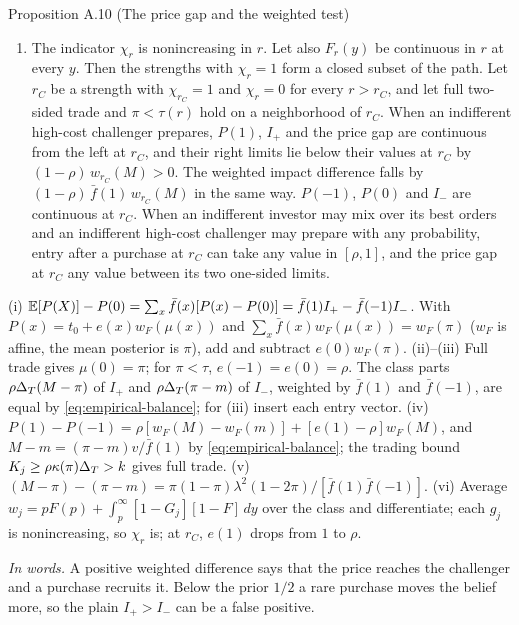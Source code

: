 {\begin{paperresult}{Proposition A.10 (The price gap and the weighted test)}
\begin{enumerate}[label=(\roman*),leftmargin=2em,nosep]
\begin{enumerate}[label=(\alph*),leftmargin=2em,nosep]
\item The indicator \(\chi_r\) is nonincreasing in \(r\). Let also \(F_r(y)\) be continuous in \(r\) at every \(y\). Then the strengths with \(\chi_r=1\) form a closed subset of the path. Let \(r_C\) be a strength with \(\chi_{r_C}=1\) and \(\chi_r=0\) for every \(r>r_C\), and let full two-sided trade and \(\pi<\tau(r)\) hold on a neighborhood of \(r_C\). When an indifferent high-cost challenger prepares, \(P(1)\), \(I_+\) and the price gap are continuous from the left at \(r_C\), and their right limits lie below their values at \(r_C\) by \((1-\rho)\,w_{r_C}(M)>0\). The weighted impact difference falls by \((1-\rho)\,\bar f(1)\,w_{r_C}(M)\) in the same way. \(P(-1)\), \(P(0)\) and \(I_-\) are continuous at \(r_C\). When an indifferent investor may mix over its best orders and an indifferent high-cost challenger may prepare with any probability, entry after a purchase at \(r_C\) can take any value in \([\rho,1]\), and the price gap at \(r_C\) any value between its two one-sided limits.
\end{enumerate}
\end{enumerate}
\end{paperresult}}

{\small\begin{derivation}[proof]
(i) \(\mathbb{E}[P(X)]-P(0)=\sum_x\bar f(x)[P(x)-P(0)]=\bar f(1)I_+-\bar f(-1)I_-\). With \(P(x)=t_0+e(x)w_F(\mu(x))\) and
\(\sum_x\bar f(x)w_F(\mu(x))=w_F(\pi)\) (\(w_F\) is affine, the mean posterior is \(\pi\)), add and subtract
\(e(0)w_F(\pi)\). (ii)--(iii) Full trade gives \(\mu(0)=\pi\); for \(\pi<\tau\), \(e(-1)=e(0)=\rho\). The class parts
\(\rho\Delta_T(M-\pi)\) of \(I_+\) and \(\rho\Delta_T(\pi-m)\) of \(I_-\), weighted by \(\bar f(1)\) and \(\bar f(-1)\), are equal
by \eqref{eq:empirical-balance}; for (iii) insert each entry vector. (iv)
\(P(1)-P(-1)=\rho[w_F(M)-w_F(m)]+[e(1)-\rho]w_F(M)\), and \(M-m=(\pi-m)v/\bar f(1)\) by
\eqref{eq:empirical-balance}; the trading bound \(K_j\ge\rho\kappa(\pi)\Delta_T>k\) gives full trade. (v)
\((M-\pi)-(\pi-m)=\pi(1-\pi)\lambda^2(1-2\pi)/[\bar f(1)\bar f(-1)]\). (vi) Average \(w_j=pF(p)+\int_p^\infty[1-G_j][1-F]\,dy\)
over the class and differentiate; each \(g_j\) is nonincreasing, so \(\chi_r\) is; at \(r_C\), \(e(1)\) drops from \(1\)
to \(\rho\).
\end{derivation}}

\emph{In words.} A positive weighted difference says that the price reaches the challenger and a purchase recruits
it. Below the prior \(1/2\) a rare purchase moves the belief more, so the plain \(I_+>I_-\) can be a false positive.

